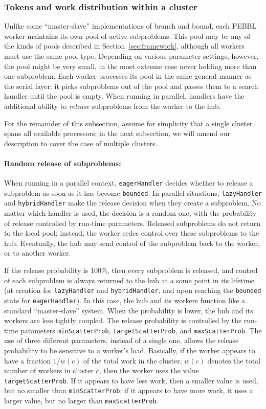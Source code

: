 \subsubsection{Tokens and work distribution within a cluster}
\label{sec:withincluster}
Unlike some ``master-slave'' implementations of branch and bound, each
PEBBL worker maintains its own pool of active subproblems.  This pool
may be any of the kinds of pools described in
Section~\ref{sec:framework}, although all workers must use the same pool
type.  Depending on various parameter settings, however,
the pool might be very small, in the most extreme case never holding more
than one subproblem.  Each worker processes its pool in the same
general manner as the serial layer: it picks subproblems out of the
pool and passes them to a search handler until the pool is empty.
When running in parallel, handlers have the additional ability to
\emph{release} subproblems from the worker to the hub.

For the remainder of this subsection, assume for simplicity that a
single cluster spans all available processors; in the next subsection,
we will amend our description to cover the case of multiple clusters.

\paragraph{Random release of subproblems:}
When running in a parallel context, \texttt{eagerHandler} decides
whether to release a subproblem as soon as it has become
\texttt{bounded}.  In parallel situations, \texttt{lazyHandler} and
\texttt{hybridHandler} make the release decision when they create a
subproblem.  No matter which handler is used, 
the decision is a random one, with the probability of
release controlled by run-time parameters.  Released subproblems do
not return to the local pool; instead, the worker cedes control over
these subproblems to the hub.  Eventually, the hub may send control of
the subproblem back to the worker, or to another worker.

If the release probability is 100\%, then every subproblem is
released, and control of each subproblem is always returned to the hub at
a some point in its lifetime (at creation for \texttt{lazyHandler}
and \texttt{hybridHandler}, and upon reaching the \texttt{bounded} state
for \texttt{eagerHandler}).  In this case, the hub and its workers
function like a standard ``master-slave'' system.  When the
probability is lower, the hub and its workers are less tightly
coupled.  The release probability is controlled by the run-time
parameters \texttt{minScatterProb}, \texttt{targetScatterProb}, and
\texttt{maxScatterProb}.  The use of three different parameters,
instead of a single one, allows the release probability to be
sensitive to a worker's load.  Basically, if the worker appears to
have a fraction $1/w(c)$ of the total work in the cluster, $w(c)$
denotes the total number of workers in 
cluster $c$, then the worker uses the value \texttt{targetScatterProb}.
If it appears to have less work, then a smaller value is used, but no
smaller than \texttt{minScatterProb}; if it appears to have more work,
it uses a larger value, but no larger than \texttt{maxScatterProb}.

